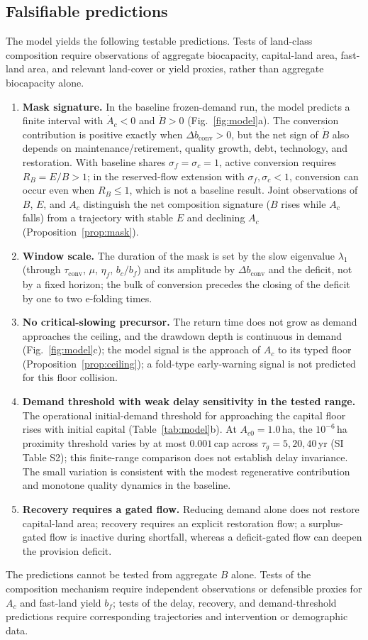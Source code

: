 \documentclass[preprint,12pt,authoryear]{elsarticle}
\newcommand{\dconv}{\Delta b_{\mathrm{conv}}}
\newcommand{\tconv}{\tau_{\mathrm{conv}}}
\begin{document}
\subsection{Falsifiable predictions}\label{sec:predictions}

The model yields the following testable predictions. Tests of land-class composition require observations of aggregate biocapacity, capital-land area, fast-land area, and relevant land-cover or yield proxies, rather than aggregate biocapacity alone.
\begin{enumerate}[label=P\arabic*.,leftmargin=2.2em]
\item \textbf{Mask signature.} In the baseline frozen-demand run, the model predicts a finite interval with $\dot A_c<0$ and $\dot B>0$ (Fig.~\ref{fig:model}a). The conversion contribution is positive exactly when $\dconv>0$, but the net sign of $\dot B$ also depends on maintenance/retirement, quality growth, debt, technology, and restoration. With baseline shares $\sigma_f=\sigma_c=1$, active conversion requires $R_B=E/B>1$; in the reserved-flow extension with $\sigma_f,\sigma_c<1$, conversion can occur even when $R_B\le1$, which is not a baseline result. Joint observations of $B$, $E$, and $A_c$ distinguish the net composition signature ($B$ rises while $A_c$ falls) from a trajectory with stable $E$ and declining $A_c$ (Proposition~\ref{prop:mask}).
\item \textbf{Window scale.} The duration of the mask is set by the slow eigenvalue $\lambda_1$ (through $\tconv$, $\mu$, $\eta_f$, $b_c/b_f$) and its amplitude by $\dconv$ and the deficit, not by a fixed horizon; the bulk of conversion precedes the closing of the deficit by one to two e-folding times.
\item \textbf{No critical-slowing precursor.} The return time does not grow as demand approaches the ceiling, and the drawdown depth is continuous in demand (Fig.~\ref{fig:model}c); the model signal is the approach of $A_c$ to its typed floor (Proposition~\ref{prop:ceiling}); a fold-type early-warning signal is not predicted for this floor collision.
\item \textbf{Demand threshold with weak delay sensitivity in the tested range.} The operational initial-demand threshold for approaching the capital floor rises with initial capital (Table~\ref{tab:model}b). At $A_{c0}=1.0$\,ha, the $10^{-6}$\,ha proximity threshold varies by at most $0.001$\,cap across $\tau_g=5,20,40$\,yr (SI Table S2); this finite-range comparison does not establish delay invariance. The small variation is consistent with the modest regenerative contribution and monotone quality dynamics in the baseline.
\item \textbf{Recovery requires a gated flow.} Reducing demand alone does not restore capital-land area; recovery requires an explicit restoration flow; a surplus-gated flow is inactive during shortfall, whereas a deficit-gated flow can deepen the provision deficit.
\end{enumerate}
The predictions cannot be tested from aggregate $B$ alone. Tests of the composition mechanism require independent observations or defensible proxies for $A_c$ and fast-land yield $b_f$; tests of the delay, recovery, and demand-threshold predictions require corresponding trajectories and intervention or demographic data.
\end{document}
